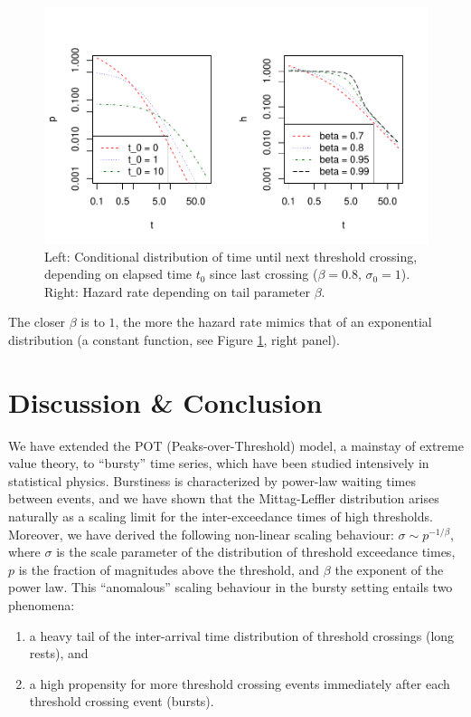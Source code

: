 \documentclass[]{elsarticle} %
\begin{document}
\begin{figure}
\includegraphics[width=\textwidth]{article_springer_files/figure-latex/hazard-1} \caption{\label{fig:hazard} Left: Conditional distribution of time until next threshold crossing, depending on elapsed time $t_0$ since last crossing ($\beta = 0.8$, $\sigma_0 = 1$). Right: Hazard rate depending on tail parameter $\beta$.}\label{fig:hazard}
\end{figure}

The closer \(\beta\) is to \(1\), the more the hazard rate mimics that
of an exponential distribution (a constant function, see Figure
\ref{fig:hazard}, right panel).

\hypertarget{discussion-conclusion}{%
\section{Discussion \& Conclusion}\label{discussion-conclusion}}

We have extended the POT (Peaks-over-Threshold) model, a mainstay of
extreme value theory, to ``bursty'' time series, which have been studied
intensively in statistical physics. Burstiness is characterized by
power-law waiting times between events, and we have shown that the
Mittag-Leffler distribution arises naturally as a scaling limit for the
inter-exceedance times of high thresholds. Moreover, we have derived the
following non-linear scaling behaviour: \(\sigma \sim p^{-1/\beta}\),
where \(\sigma\) is the scale parameter of the distribution of threshold
exceedance times, \(p\) is the fraction of magnitudes above the
threshold, and \(\beta\) the exponent of the power law. This
``anomalous'' scaling behaviour in the bursty setting entails two
phenomena:

\begin{enumerate}
\def\labelenumi{\roman{enumi})}
\item
  a heavy tail of the inter-arrival time distribution of threshold
  crossings (long rests), and
\item
  a high propensity for more threshold crossing events immediately after
  each threshold crossing event (bursts).
\end{enumerate}
\end{document}
